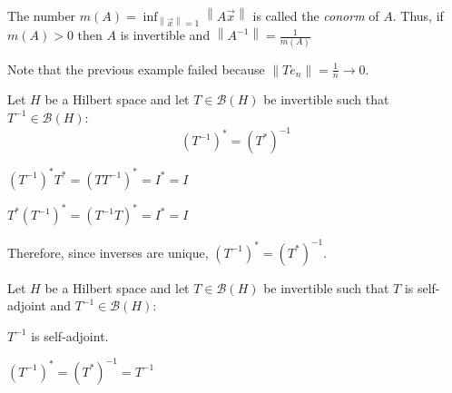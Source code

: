\documentclass[letterpaper,12pt,fleqn]{article}
\newcommand{\mb}{\mathcal{B}}
\newcommand{\vx}{\vec{x}}
\newcommand{\norm}[1]{\left\|#1\right\|}
\begin{document}
The number $m(A)=\inf_{\norm{\vx}=1}\norm{A\vx}$ is called the \emph{conorm} of
$A$. Thus, if $m(A)>0$ then $A$ is invertible and
$\norm{A^{-1}}=\frac{1}{m(A)}$

Note that the previous example failed because $\norm{Te_n}=\frac{1}{n}\to0$.

\begin{theorem}
  Let $H$ be a Hilbert space and let $T\in\mb(H)$ be invertible such that
  $T^{-1}\in\mb(H)$:
  \[(T^{-1})^*=(T^*)^{-1}\]
\end{theorem}

\begin{theproof}
  $(T^{-1})^*T^*=(TT^{-1})^*=I^*=I$

  $T^*(T^{-1})^*=(T^{-1}T)^*=I^*=I$

  Therefore, since inverses are unique, $(T^{-1})^*=(T^*)^{-1}$.
\end{theproof}

\begin{corollary}
  Let $H$ be a Hilbert space and let $T\in\mb(H)$ be invertible such that
  $T$ is self-adjoint and $T^{-1}\in\mb(H)$:
  
  \qquad$T^{-1}$ is self-adjoint.
\end{corollary}

\begin{theproof}
  $(T^{-1})^*=(T^*)^{-1}=T^{-1}$
\end{theproof}
\end{document}
